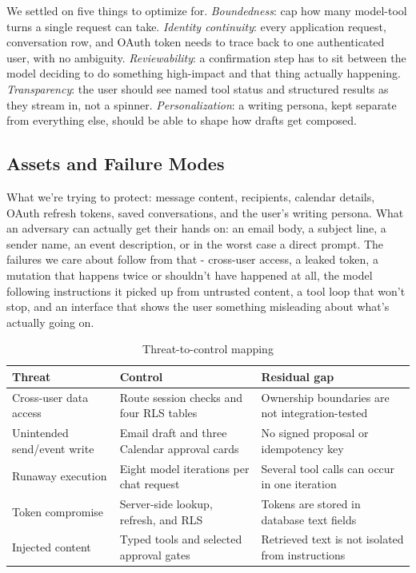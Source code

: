 \documentclass[conference]{IEEEtran}
\begin{document}
We settled on five things to optimize for. \emph{Boundedness}: cap how many model-tool turns a single request can take. \emph{Identity continuity}: every application request, conversation row, and OAuth token needs to trace back to one authenticated user, with no ambiguity. \emph{Reviewability}: a confirmation step has to sit between the model deciding to do something high-impact and that thing actually happening. \emph{Transparency}: the user should see named tool status and structured results as they stream in, not a spinner. \emph{Personalization}: a writing persona, kept separate from everything else, should be able to shape how drafts get composed.

\subsection{Assets and Failure Modes}

What we're trying to protect: message content, recipients, calendar details, OAuth refresh tokens, saved conversations, and the user's writing persona. What an adversary can actually get their hands on: an email body, a subject line, a sender name, an event description, or in the worst case a direct prompt. The failures we care about follow from that - cross-user access, a leaked token, a mutation that happens twice or shouldn't have happened at all, the model following instructions it picked up from untrusted content, a tool loop that won't stop, and an interface that shows the user something misleading about what's actually going on.

\begin{table}[t]
\centering
\caption{Threat-to-control mapping}
\scriptsize
\begin{tabularx}{\columnwidth}{@{}p{}YY@{}}
\toprule
\textbf{Threat} & \textbf{Control} & \textbf{Residual gap} \\
\midrule
Cross-user data access & Route session checks and four RLS tables & Ownership boundaries are not integration-tested \\
Unintended send/event write & Email draft and three Calendar approval cards & No signed proposal or idempotency key \\
Runaway execution & Eight model iterations per chat request & Several tool calls can occur in one iteration \\
Token compromise & Server-side lookup, refresh, and RLS & Tokens are stored in database text fields \\
Injected content & Typed tools and selected approval gates & Retrieved text is not isolated from instructions \\
\bottomrule
\end{tabularx}
\end{table}
\end{document}
